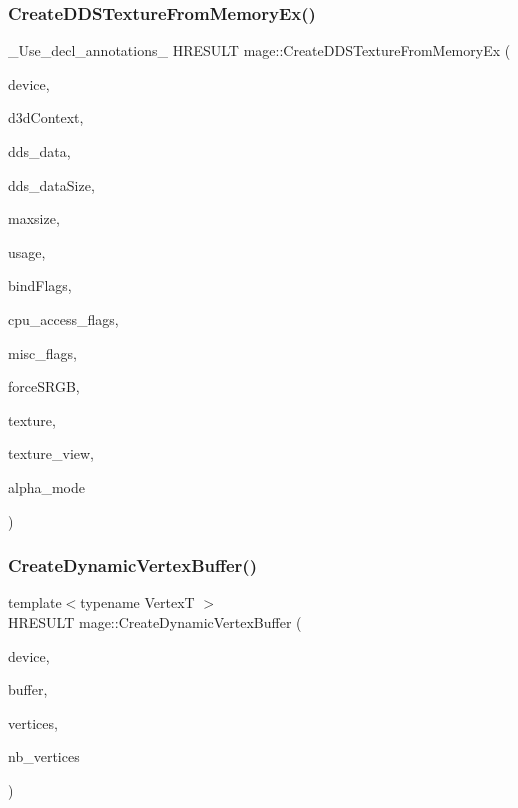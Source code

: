 \subsubsection{\texorpdfstring{Create\+D\+D\+S\+Texture\+From\+Memory\+Ex()}{CreateDDSTextureFromMemoryEx()}\hspace{0.1cm}{\footnotesize\ttfamily [4/4]}}
{\footnotesize\ttfamily \+\_\+\+Use\+\_\+decl\+\_\+annotations\+\_\+ H\+R\+E\+S\+U\+LT mage\+::\+Create\+D\+D\+S\+Texture\+From\+Memory\+Ex (\begin{DoxyParamCaption}\item[{\hyperlink{namespacemage_ae74f374780900893caa5555d1031fd79}{Com\+Ptr}$<$ I\+D3\+D11\+Device2 $>$}]{device,  }\item[{I\+D3\+D11\+Device\+Context $\ast$}]{d3d\+Context,  }\item[{const uint8\+\_\+t $\ast$}]{dds\+\_\+data,  }\item[{size\+\_\+t}]{dds\+\_\+data\+Size,  }\item[{size\+\_\+t}]{maxsize,  }\item[{D3\+D11\+\_\+\+U\+S\+A\+GE}]{usage,  }\item[{uint32\+\_\+t}]{bind\+Flags,  }\item[{uint32\+\_\+t}]{cpu\+\_\+access\+\_\+flags,  }\item[{uint32\+\_\+t}]{misc\+\_\+flags,  }\item[{bool}]{force\+S\+R\+GB,  }\item[{I\+D3\+D11\+Resource $\ast$$\ast$}]{texture,  }\item[{I\+D3\+D11\+Shader\+Resource\+View $\ast$$\ast$}]{texture\+\_\+view,  }\item[{\hyperlink{namespacemage_a0c586a2bad862f4858900ca121ca80c2}{D\+D\+S\+\_\+\+A\+L\+P\+H\+A\+\_\+\+M\+O\+DE} $\ast$}]{alpha\+\_\+mode }\end{DoxyParamCaption})}

\hypertarget{namespacemage_a6eece2ea3b3e3962a748105ffe82b29a}{}\label{namespacemage_a6eece2ea3b3e3962a748105ffe82b29a} 
\subsubsection{\texorpdfstring{Create\+Dynamic\+Vertex\+Buffer()}{CreateDynamicVertexBuffer()}}
{\footnotesize\ttfamily template$<$typename VertexT $>$ \\
H\+R\+E\+S\+U\+LT mage\+::\+Create\+Dynamic\+Vertex\+Buffer (\begin{DoxyParamCaption}\item[{\hyperlink{namespacemage_ae74f374780900893caa5555d1031fd79}{Com\+Ptr}$<$ I\+D3\+D11\+Device2 $>$}]{device,  }\item[{I\+D3\+D11\+Buffer $\ast$$\ast$}]{buffer,  }\item[{const VertexT $\ast$}]{vertices,  }\item[{size\+\_\+t}]{nb\+\_\+vertices }\end{DoxyParamCaption})}

